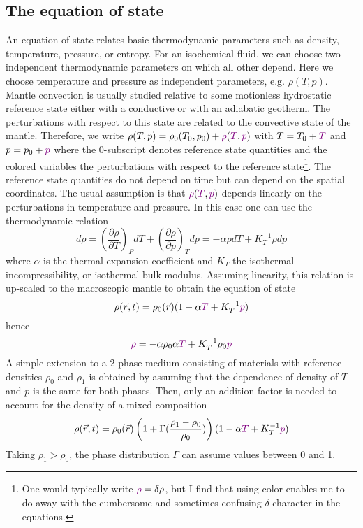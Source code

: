\subsection{The equation of state}

An equation of state relates basic thermodynamic parameters such as density,
temperature, pressure, or entropy. For an isochemical fluid, we can choose two
independent thermodynamic parameters on which all other depend. Here we choose
temperature and pressure as independent parameters, e.g. $\rho(T,p)$. 
Mantle convection is
usually studied relative to some motionless hydrostatic reference state either with a
conductive or with an adiabatic geotherm. The perturbations with respect to this state are
related to the convective state of the mantle. 
Therefore, we write $\rho(T,p) = \rho_0(T_0,p_0) 
+ {\color{violet}\rho}({\color{violet}T},{\color{violet} p} )$
with 
$T = T_0 + {\color{violet}T}$ and 
$p = p_0 + {\color{violet}p}$ 
where the 0-subscript denotes reference
state quantities and the {\color{violet}colored} variables 
the perturbations with respect to the reference state\footnote{One would typically 
write ${\color{violet}\rho}=\delta \rho$, but I find that using color enables me
to do away with the cumbersome and sometimes confusing $\delta$ character in the equations.}. 
The reference state quantities do not depend on time but can depend on the spatial
coordinates. The usual assumption is that ${\color{violet}\rho}({\color{violet}T},{\color{violet} p})$ 
depends linearly on the perturbations in temperature and pressure. 
In this case one can use the thermodynamic relation
\[
d\rho = 
\left( \frac{\partial \rho}{\partial T} \right)_P dT + 
\left( \frac{\partial \rho}{\partial p} \right)_T dp 
= -\alpha \rho dT + K_T^{-1} \rho dp
\]
where $\alpha$ is the thermal expansion coefficient and 
$K_T$ the isothermal incompressibility, or isothermal bulk
modulus. Assuming linearity, this relation is up-scaled to the macroscopic mantle to
obtain the equation of state
\begin{equation}
\rho(\vec{r},t) = \rho_0(\vec{r}) (1-\alpha {\color{violet}T} + K_T^{-1} {\color{violet}p} )
\label{eq:md68}
\end{equation}
hence
\[
{\color{violet} \rho} = -\alpha \rho_0 \alpha {\color{violet}T} +  K_T^{-1} \rho_0 {\color{violet}p} 
\]
A simple extension to a 2-phase medium consisting of materials with reference
densities $\rho_0$ and $\rho_1$ is obtained by assuming that the dependence of density of $T$ and $p$ 
is the same for both phases. Then, only an addition factor is needed to account for the
density of a mixed composition
\begin{equation}
\rho(\vec{r},t) = \rho_0(\vec{r})\left(1+\Gamma(\frac{\rho_1-\rho_0}{\rho_0}) \right) 
(1-\alpha {\color{violet}T} + K_T^{-1} {\color{violet}p} )
\label{eq:md69}
\end{equation}
Taking $\rho_1>\rho_0$, the phase distribution $\Gamma$ can assume values between 0 and 1.

